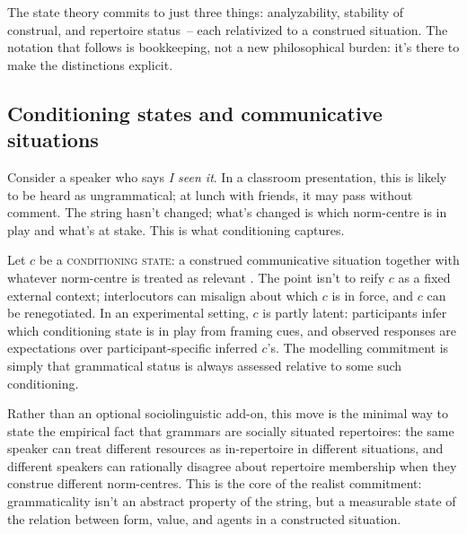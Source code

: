\documentclass[12pt,letterpaper]{article}
\newcommand{\term}[1]{\textsc{#1}}
\newcommand{\mention}[1]{\textit{#1}}
\begin{document}
The state theory commits to just three things: analyzability, stability of construal, and repertoire status~-- each relativized to a construed situation. The notation that follows is bookkeeping, not a new philosophical burden: it's there to make the distinctions explicit.

\subsection{Conditioning states and communicative situations}

Consider a speaker who says \mention{I seen it}. In a classroom presentation, this is likely to be heard as ungrammatical; at lunch with friends, it may pass without comment. The string hasn't changed; what's changed is which norm-centre is in play and what's at stake. This is what conditioning captures.

Let $c$ be a \term{conditioning state}: a construed communicative situation together with whatever norm-centre is treated as relevant \autocite{wiese2023}. The point isn't to reify $c$ as a fixed external context; interlocutors can misalign about which $c$ is in force, and $c$ can be renegotiated. In an experimental setting, $c$ is partly latent: participants infer which conditioning state is in play from framing cues, and observed responses are expectations over participant-specific inferred $c$'s. The modelling commitment is simply that grammatical status is always assessed relative to some such conditioning.

Rather than an optional sociolinguistic add-on, this move is the minimal way to state the empirical fact that grammars are socially situated repertoires: the same speaker can treat different resources as in-repertoire in different situations, and different speakers can rationally disagree about repertoire membership when they construe different norm-centres. This is the core of the realist commitment: grammaticality isn't an abstract property of the string, but a measurable state of the relation between form, value, and agents in a constructed situation.
\end{document}

